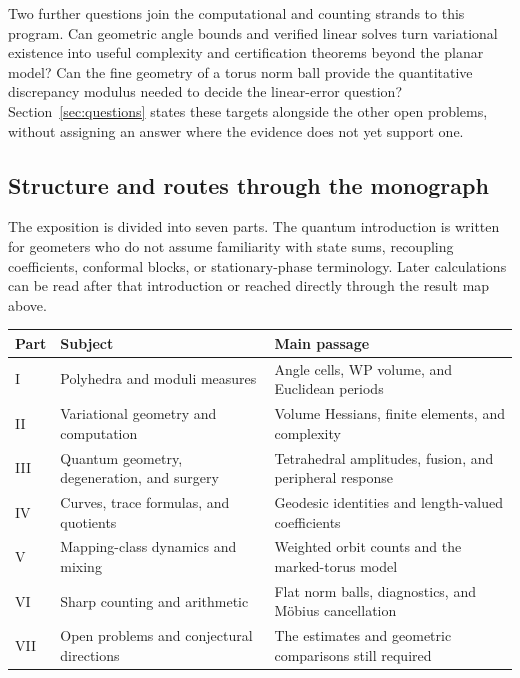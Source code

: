 \documentclass[11pt,a4paper]{article}
\numberwithin{equation}{section}
\theoremstyle{definition}
\theoremstyle{remark}
\begin{document}
Two further questions join the computational and counting strands to
this program. Can geometric angle bounds and verified linear solves
turn variational existence into useful complexity and certification
theorems beyond the planar model? Can the fine geometry of a torus
norm ball provide the quantitative discrepancy modulus needed to decide
the linear-error question? Section~\ref{sec:questions} states these
targets alongside the other open problems, without assigning an answer
where the evidence does not yet support one.

\subsection*{Structure and routes through the monograph}

The exposition is divided into seven parts. The quantum introduction is
written for geometers who do not assume familiarity with state sums,
recoupling coefficients, conformal blocks, or stationary-phase terminology.
Later calculations can be read after that introduction or reached
directly through the result map above.

\begin{center}
\small
\begin{tabular}{@{}p{}p{}p{}@{}}
\toprule
Part & Subject & Main passage \\
\midrule
I & Polyhedra and moduli measures & Angle cells, WP volume, and Euclidean periods \\[4pt]
II & Variational geometry and computation & Volume Hessians, finite elements, and complexity \\[4pt]
III & Quantum geometry, degeneration, and surgery & Tetrahedral amplitudes, fusion, and peripheral response \\[4pt]
IV & Curves, trace formulas, and quotients & Geodesic identities and length-valued coefficients \\[4pt]
V & Mapping-class dynamics and mixing & Weighted orbit counts and the marked-torus model \\[4pt]
VI & Sharp counting and arithmetic & Flat norm balls, diagnostics, and M\"obius cancellation \\[4pt]
VII & Open problems and conjectural directions & The estimates and geometric comparisons still required \\
\bottomrule
\end{tabular}
\end{center}
\end{document}
